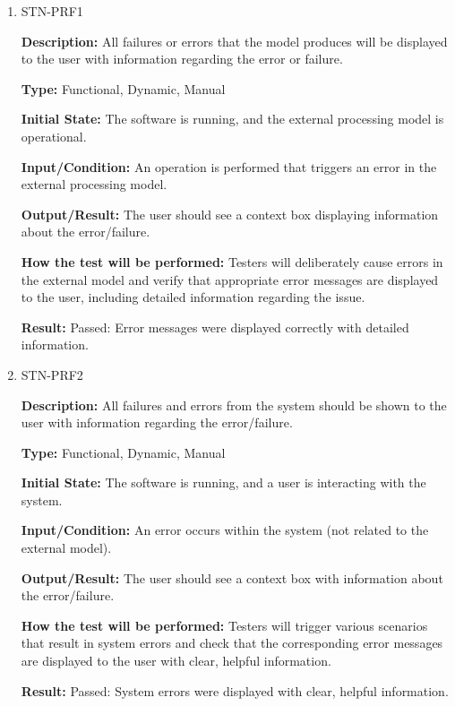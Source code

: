 \documentclass[12pt, titlepage]{article}
\begin{document}
\begin{enumerate}

\item{STN-PRF1\\}

\textbf{Description:} All failures or errors that the model produces will be displayed to the user with information regarding the error or failure.

\textbf{Type:} Functional, Dynamic, Manual

\textbf{Initial State:} The software is running, and the external processing model is operational.

\textbf{Input/Condition:} An operation is performed that triggers an error in the external processing model.

\textbf{Output/Result:} The user should see a context box displaying information about the error/failure.

\textbf{How the test will be performed:} Testers will deliberately cause errors in the external model and verify that appropriate error messages are displayed to the user, including detailed information regarding the issue.

\textbf{Result:} Passed: Error messages were displayed correctly with detailed information.

\item{STN-PRF2\\}

\textbf{Description:} All failures and errors from the system should be shown to the user with information regarding the error/failure.

\textbf{Type:} Functional, Dynamic, Manual

\textbf{Initial State:} The software is running, and a user is interacting with the system.

\textbf{Input/Condition:} An error occurs within the system (not related to the external model).

\textbf{Output/Result:} The user should see a context box with information about the error/failure.

\textbf{How the test will be performed:} Testers will trigger various scenarios that result in system errors and check that the corresponding error messages are displayed to the user with clear, helpful information.

\textbf{Result:} Passed: System errors were displayed with clear, helpful information.

\end{enumerate}
\end{document}
